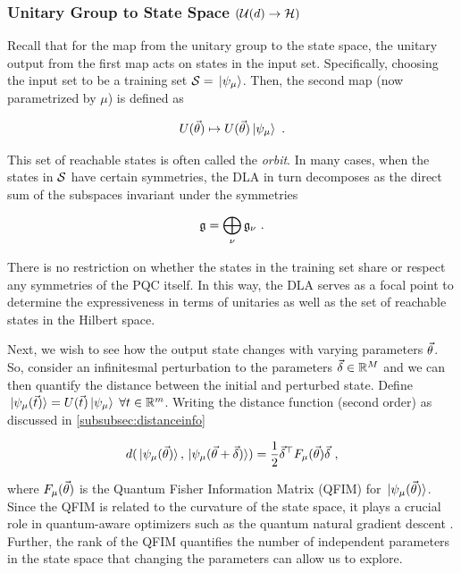 \subsubsection{Unitary Group to State Space \((\mathcal{U}(d) \to
\mathcal{H})\)} 

Recall that for the map from the unitary group to the state space, the unitary
output from the first map acts on states in the input set. Specifically,
choosing the input set to be a training set \(\mathcal{S} = \ket*{\psi_\mu}\).
Then, the second map (now parametrized by \(\mu\)) is defined as

\begin{equation}
    U(\vec{\theta}) \mapsto U(\vec{\theta})\ket*{\psi_\mu}~.
\end{equation}

This set of reachable states is often called the \emph{orbit}. In many cases,
when the states in \(\mathcal{S}\) have certain symmetries, the DLA in turn
decomposes as the direct sum of the subspaces invariant under the symmetries

\begin{equation}
    \mathfrak{g} = \bigoplus_\nu \mathfrak{g}_\nu~.
\end{equation}

There is no restriction on whether the states in the training set share or
respect any symmetries of the PQC itself. In this way, the DLA serves as a focal
point to determine the expressiveness in terms of unitaries as well as the set
of reachable states in the Hilbert space.

Next, we wish to see how the output state changes with varying parameters
\(\vec{\theta}\). So, consider an infinitesmal perturbation to the parameters
\(\vec{\delta} \in \mathbb{R}^M\) and we can then quantify the distance between the
initial and perturbed state. Define \(\ket*{\psi_\mu(\vec{t})} =
U(\vec{t})\ket*{\psi_\mu}\;\forall t \in \mathbb{R}^m\). Writing the distance
function (second order) as discussed in \autoref{subsubsec:distanceinfo}

\begin{equation}
    d(\ket*{\psi_\mu (\vec{\theta})}, \ket*{\psi_\mu(\vec{\theta} + \vec{\delta})}) 
        = \frac{1}{2} \vec{\delta}^\top F_\mu(\vec{\theta}) \vec{\delta}~,
\end{equation}

where \(F_\mu(\vec{\theta})\) is the Quantum Fisher Information Matrix (QFIM) for
\(\ket*{\psi_\mu(\vec{\theta})}\). Since the QFIM is related to the curvature of
the state space, it plays a crucial role in quantum-aware optimizers such as the
quantum natural gradient descent
\cite{stokes2020quantum,koczor2019quantum,gacon2021simultaneous,haug2021natural}.
Further, the rank of the QFIM quantifies the number of independent parameters in
the state space that changing the parameters can allow us to explore.

